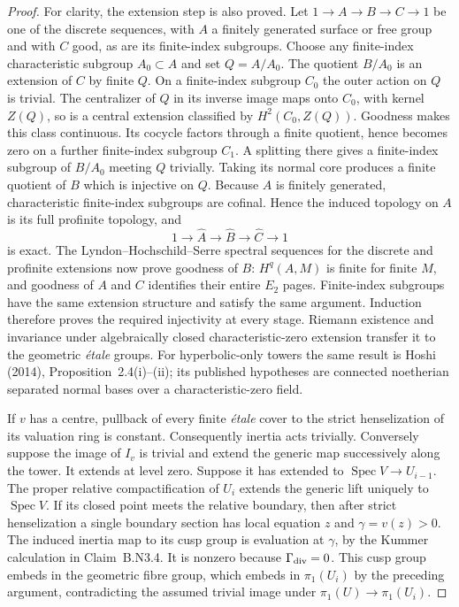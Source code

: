 \begin{proof}
For clarity, the extension step is also proved.  Let
$1\to A\to B\to C\to1$ be one of the discrete sequences, with
$A$ a finitely generated surface or free group and with $C$ good,
as are its finite-index subgroups.  Choose any finite-index
characteristic subgroup $A_0\subset A$ and set $Q=A/A_0$.
The quotient $B/A_0$ is an extension of $C$ by finite $Q$.
On a finite-index subgroup $C_0$ the outer action on $Q$ is trivial.
The centralizer of $Q$ in its inverse image maps onto $C_0$, with
kernel $Z(Q)$, so is a central extension classified by
$H^2(C_0,Z(Q))$.  Goodness makes this class continuous.  Its cocycle
factors through a finite quotient, hence becomes zero on a further
finite-index subgroup $C_1$.  A splitting there gives a finite-index
subgroup of $B/A_0$ meeting $Q$ trivially.  Taking its normal core
produces a finite quotient of $B$ which is injective on $Q$.
Because $A$ is finitely generated, characteristic finite-index
subgroups are cofinal.  Hence the induced topology on $A$ is its
full profinite topology, and
\[
 1\to\widehat A\to\widehat B\to\widehat C\to1
\]
is exact.  The Lyndon--Hochschild--Serre spectral sequences for the
discrete and profinite extensions now prove goodness of $B$:
$H^q(A,M)$ is finite for finite $M$, and goodness of $A$ and $C$
identifies their entire $E_2$ pages.  Finite-index subgroups have
the same extension structure and satisfy the same argument.  Induction
therefore proves the required injectivity at every stage.  Riemann
existence and invariance under algebraically closed characteristic-zero
extension transfer it to the geometric \emph{\'etale} groups.
For hyperbolic-only towers the same result is Hoshi (2014),
Proposition~2.4(i)--(ii); its published hypotheses are connected
noetherian separated normal bases over a characteristic-zero field.

If $v$ has a centre, pullback of every finite \emph{\'etale} cover
to the strict henselization of its valuation ring is constant.
Consequently inertia acts trivially.  Conversely suppose the image
of $I_v$ is trivial and extend the generic map successively along
the tower.  It extends at level zero.  Suppose it has extended to
$\operatorname{Spec}V\to U_{i-1}$.  The proper relative
compactification of $U_i$ extends the generic lift uniquely to
$\operatorname{Spec}V$.  If its closed point meets the relative
boundary, then after strict henselization a single boundary section
has local equation $z$ and $\gamma=v(z)>0$.  The induced inertia
map to its cusp group is evaluation at $\gamma$, by the Kummer
calculation in Claim~B.N3.4.  It is nonzero because
$\Gamma_{\rm div}=0$.  This cusp group embeds in the geometric
fibre group, which embeds in $\pi_1(U_i)$ by the preceding argument,
contradicting the assumed trivial image under
$\pi_1(U)\to\pi_1(U_i)$.


\end{proof}
